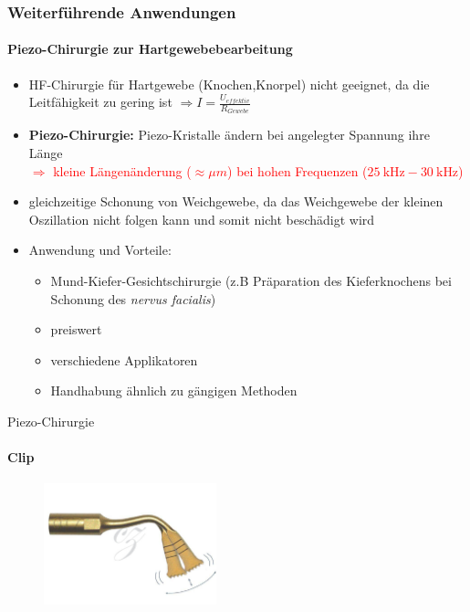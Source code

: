 \documentclass{beamer}
\begin{document}
\begin{frame}
\frametitle{Weiterführende Anwendungen}
\framesubtitle{Piezo-Chirurgie zur Hartgewebebearbeitung}
	\begin{itemize}
		\item HF-Chirurgie für Hartgewebe (Knochen,Knorpel) nicht geeignet, da die Leitfähigkeit zu gering ist $\Rightarrow I=\frac{U_{effektiv}}{R_{Gewebe}}$
		\item \textbf{Piezo-Chirurgie:} Piezo-Kristalle ändern bei angelegter Spannung ihre Länge\\
		\textcolor{red}{$\Rightarrow$ kleine Längenänderung ($\approx\mu m$) bei hohen Frequenzen ($\SI{25}{\kilo\hertz}-\SI{30}{\kilo\hertz}$)}	
		\item gleichzeitige Schonung von Weichgewebe, da das Weichgewebe der kleinen Oszillation nicht folgen kann und somit nicht beschädigt wird
		\item Anwendung und Vorteile:
		\begin{itemize}
			\item Mund-Kiefer-Gesichtschirurgie (z.B Präparation des Kieferknochens bei Schonung des \emph{nervus facialis})
			\item preiswert
			\item verschiedene Applikatoren
			\item Handhabung ähnlich zu gängigen Methoden
		\end{itemize}
	\end{itemize}
\end{frame}


\begin{frame}{Piezo-Chirurgie}
\framesubtitle{Clip}
\begin{figure}
	\centering
	\includegraphics[width=5cm]{images/piezoChirurgie.png}
\end{figure}
\end{frame}
\end{document}
